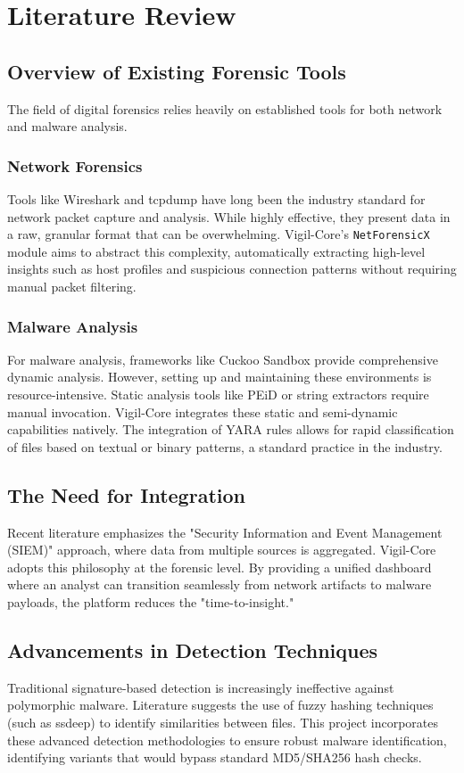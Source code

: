 \chapter{Literature Review}

\section{Overview of Existing Forensic Tools}
The field of digital forensics relies heavily on established tools for both network and malware analysis. 

\subsection{Network Forensics}
Tools like Wireshark and tcpdump have long been the industry standard for network packet capture and analysis. While highly effective, they present data in a raw, granular format that can be overwhelming. Vigil-Core's \texttt{NetForensicX} module aims to abstract this complexity, automatically extracting high-level insights such as host profiles and suspicious connection patterns without requiring manual packet filtering.

\subsection{Malware Analysis}
For malware analysis, frameworks like Cuckoo Sandbox provide comprehensive dynamic analysis. However, setting up and maintaining these environments is resource-intensive. Static analysis tools like PEiD or string extractors require manual invocation. Vigil-Core integrates these static and semi-dynamic capabilities natively. The integration of YARA rules allows for rapid classification of files based on textual or binary patterns, a standard practice in the industry.

\section{The Need for Integration}
Recent literature emphasizes the "Security Information and Event Management (SIEM)" approach, where data from multiple sources is aggregated. Vigil-Core adopts this philosophy at the forensic level. By providing a unified dashboard where an analyst can transition seamlessly from network artifacts to malware payloads, the platform reduces the "time-to-insight."

\section{Advancements in Detection Techniques}
Traditional signature-based detection is increasingly ineffective against polymorphic malware. Literature suggests the use of fuzzy hashing techniques (such as ssdeep) to identify similarities between files. This project incorporates these advanced detection methodologies to ensure robust malware identification, identifying variants that would bypass standard MD5/SHA256 hash checks.
